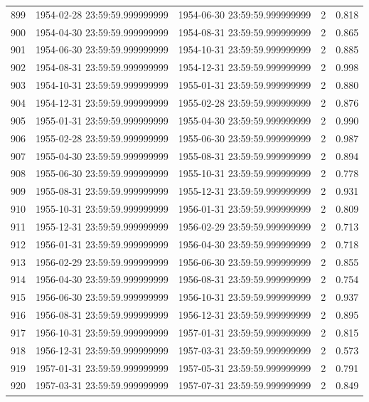 \begin{table}
\begin{tabular}{lcccc}
899 & 1954-02-28 23:59:59.999999999 & 1954-06-30 23:59:59.999999999 & 2 & 0.818 \\
900 & 1954-04-30 23:59:59.999999999 & 1954-08-31 23:59:59.999999999 & 2 & 0.865 \\
901 & 1954-06-30 23:59:59.999999999 & 1954-10-31 23:59:59.999999999 & 2 & 0.885 \\
902 & 1954-08-31 23:59:59.999999999 & 1954-12-31 23:59:59.999999999 & 2 & 0.998 \\
903 & 1954-10-31 23:59:59.999999999 & 1955-01-31 23:59:59.999999999 & 2 & 0.880 \\
904 & 1954-12-31 23:59:59.999999999 & 1955-02-28 23:59:59.999999999 & 2 & 0.876 \\
905 & 1955-01-31 23:59:59.999999999 & 1955-04-30 23:59:59.999999999 & 2 & 0.990 \\
906 & 1955-02-28 23:59:59.999999999 & 1955-06-30 23:59:59.999999999 & 2 & 0.987 \\
907 & 1955-04-30 23:59:59.999999999 & 1955-08-31 23:59:59.999999999 & 2 & 0.894 \\
908 & 1955-06-30 23:59:59.999999999 & 1955-10-31 23:59:59.999999999 & 2 & 0.778 \\
909 & 1955-08-31 23:59:59.999999999 & 1955-12-31 23:59:59.999999999 & 2 & 0.931 \\
910 & 1955-10-31 23:59:59.999999999 & 1956-01-31 23:59:59.999999999 & 2 & 0.809 \\
911 & 1955-12-31 23:59:59.999999999 & 1956-02-29 23:59:59.999999999 & 2 & 0.713 \\
912 & 1956-01-31 23:59:59.999999999 & 1956-04-30 23:59:59.999999999 & 2 & 0.718 \\
913 & 1956-02-29 23:59:59.999999999 & 1956-06-30 23:59:59.999999999 & 2 & 0.855 \\
914 & 1956-04-30 23:59:59.999999999 & 1956-08-31 23:59:59.999999999 & 2 & 0.754 \\
915 & 1956-06-30 23:59:59.999999999 & 1956-10-31 23:59:59.999999999 & 2 & 0.937 \\
916 & 1956-08-31 23:59:59.999999999 & 1956-12-31 23:59:59.999999999 & 2 & 0.895 \\
917 & 1956-10-31 23:59:59.999999999 & 1957-01-31 23:59:59.999999999 & 2 & 0.815 \\
918 & 1956-12-31 23:59:59.999999999 & 1957-03-31 23:59:59.999999999 & 2 & 0.573 \\
919 & 1957-01-31 23:59:59.999999999 & 1957-05-31 23:59:59.999999999 & 2 & 0.791 \\
920 & 1957-03-31 23:59:59.999999999 & 1957-07-31 23:59:59.999999999 & 2 & 0.849 \\

\end{tabular}
\end{table}
